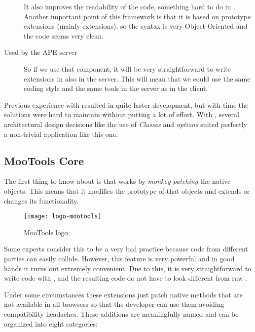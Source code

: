\begin{description}
  It also improves the readability of the code, something hard to do in .
  Another important point of this framework is that it is based on prototype extensions (mainly  extensions), so the syntax is very Object-Oriented and the code seems very clean.

  \item[Used by the \ac{APE} server\index{APE server}]
  So if we use that component, it will be very straightforward to write extensions in  also in the server.
  This will mean that we could use the same coding style and the same tools in the server as in the client.

\end{description}

Previous experience with  resulted in quite faster development, but with time the solutions were hard to maintain without putting a lot of effort.
With , several architectural design decisions like the use of \emph{Classes} and \emph{options} suited perfectly a non-trivial application like this one.


\subsection{MooTools Core} %
\label{sub:mootools_core}

The first thing to know about  is that works by \emph{monkey-patching} the native objects.
This means that it modifies the prototype of that objects and extends or changes its functionality.

\begin{wrapfigure}{r}{0.5\textwidth}
  \centering
    \texttt{[image: logo-mootools]}
  \caption{MooTools logo}
  \label{fig:logo-mootools}
\end{wrapfigure}

Some experts consider this to be a very bad practice because code from different parties can easily collide.
However, this  feature is very powerful and in good hands it turns out extremely convenient.
Due to this, it is very straightforward to write code with , and the resulting code do not have to look different from raw .

Under some circumstances these extensions just patch native methods that are not available in all browsers so that the developer can use them avoiding compatibility headaches.
These additions are meaningfully named and can be organized into eight categories:

